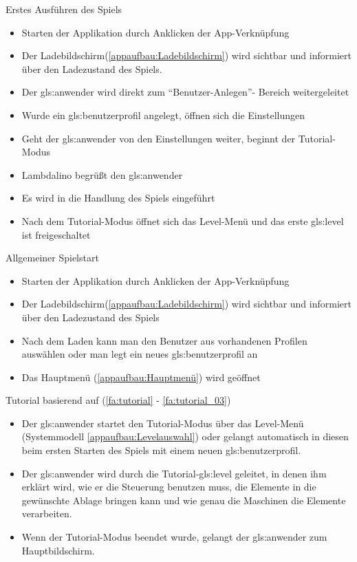 \documentclass{scrartcl}
\begin{document}
\begin{telist}
	\item{Erstes Ausführen des Spiels} \label{szenarien:first_run}
	\begin{itemize}
		\item Starten der Applikation durch Anklicken der App-Verknüpfung
		\item Der Ladebildschirm(\ref{appaufbau:Ladebildschirm}) wird sichtbar und informiert über den Ladezustand des Spiels.
		\item Der \gls{gls:anwender} wird direkt zum "`Benutzer-Anlegen"'- Bereich weitergeleitet
		\item Wurde ein \gls{gls:benutzerprofil} angelegt, öffnen sich die Einstellungen
		\item Geht der \gls{gls:anwender} von den Einstellungen weiter, beginnt der Tutorial-Modus
		\item Lambdalino begrüßt den \gls{gls:anwender}
		\item Es wird in die Handlung des Spiels eingeführt
		\item Nach dem Tutorial-Modus öffnet sich das Level-Menü und das erste \gls{gls:level} ist freigeschaltet 
	\end{itemize}
	
	\item{Allgemeiner Spielstart} \label{szenarien:allg_spielstart}
	\begin{itemize}
		\item Starten der Applikation durch Anklicken der App-Verknüpfung
		\item Der Ladebildschirm(\ref{appaufbau:Ladebildschirm}) wird sichtbar und informiert über den Ladezustand des Spiels
		\item Nach dem Laden kann man den Benutzer aus vorhandenen Profilen auswählen oder man legt ein neues \gls{gls:benutzerprofil} an
		\item Das Hauptmenü (\ref{appaufbau:Hauptmenü}) wird geöffnet		
	\end{itemize}
	
	\item Tutorial basierend auf (\ref{fa:tutorial} - \ref{fa:tutorial_03})
	\begin{itemize}
		\item Der \gls{gls:anwender} startet den Tutorial-Modus über das Level-Menü (Systemmodell \ref{appaufbau:Levelauswahl}) oder gelangt automatisch in diesen beim ersten Starten des Spiels mit einem neuen \gls{gls:benutzerprofil}.
		\item Der \gls{gls:anwender} wird durch die Tutorial-\gls{gls:level} geleitet, in denen ihm erklärt wird, wie er die Steuerung benutzen muss, die Elemente in die gewünschte Ablage bringen kann und wie genau die Maschinen die Elemente verarbeiten.
		\item Wenn der Tutorial-Modus beendet wurde, gelangt der \gls{gls:anwender} zum Hauptbildschirm.
	\end{itemize}


\end{telist}
\end{document}
